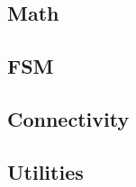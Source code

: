 \documentclass{article}
\begin{document}
\subsection{Math}











% 

% 

% 


\subsection{FSM}




\subsection{Connectivity}














\subsection{Utilities}







%






\end{document}

